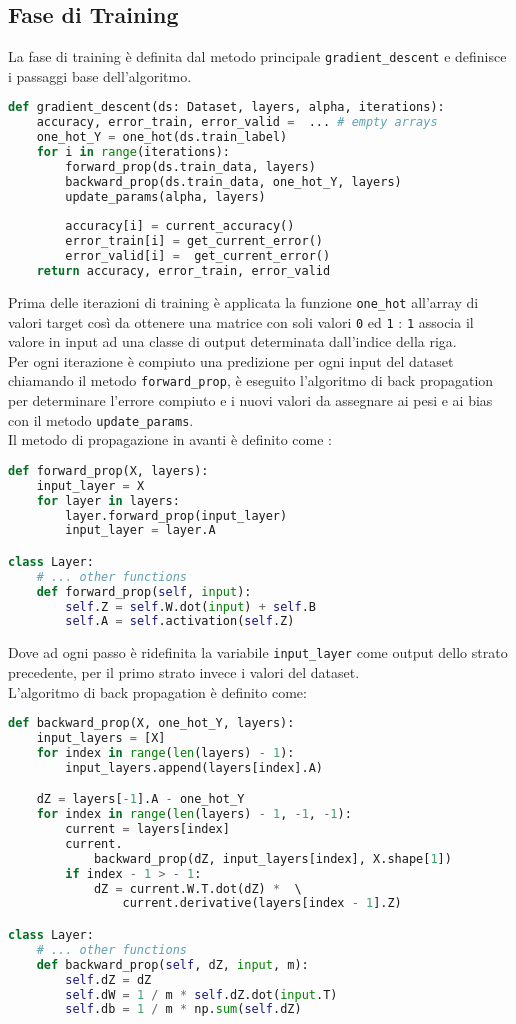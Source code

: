 \subsection{Fase di Training}
La fase di training è definita dal metodo principale \texttt{gradient\_descent} e definisce i passaggi base dell'algoritmo.
\begin{lstlisting}[language=Python]
def gradient_descent(ds: Dataset, layers, alpha, iterations):
    accuracy, error_train, error_valid =  ... # empty arrays
    one_hot_Y = one_hot(ds.train_label)
    for i in range(iterations):
        forward_prop(ds.train_data, layers)
        backward_prop(ds.train_data, one_hot_Y, layers)
        update_params(alpha, layers)
        
        accuracy[i] = current_accuracy()
        error_train[i] = get_current_error()
        error_valid[i] =  get_current_error()
    return accuracy, error_train, error_valid
\end{lstlisting}
Prima delle iterazioni di training è applicata la funzione \texttt{one\_hot} all'array di valori target così da ottenere una matrice con soli valori \texttt{0} ed \texttt{1} : \texttt{1} associa il valore in input ad una classe di output determinata dall'indice della riga. \\
Per ogni iterazione è compiuto una predizione per ogni input del dataset chiamando il metodo \texttt{forward\_prop}, è eseguito l'algoritmo di back propagation per determinare l'errore compiuto e i nuovi valori da assegnare ai pesi e ai bias con il metodo \texttt{update\_params}. \\
Il metodo di propagazione in avanti è definito come :
\begin{lstlisting}[language=Python]
def forward_prop(X, layers):
    input_layer = X
    for layer in layers:
        layer.forward_prop(input_layer)
        input_layer = layer.A

class Layer:
    # ... other functions
    def forward_prop(self, input):
        self.Z = self.W.dot(input) + self.B
        self.A = self.activation(self.Z)
\end{lstlisting}
Dove ad ogni passo è ridefinita la variabile \texttt{input\_layer} come output dello strato precedente, per il primo strato invece i valori del dataset. \\
L'algoritmo di back propagation è definito come:
\begin{lstlisting}[language=Python]
def backward_prop(X, one_hot_Y, layers):
    input_layers = [X]
    for index in range(len(layers) - 1):
        input_layers.append(layers[index].A)

    dZ = layers[-1].A - one_hot_Y
    for index in range(len(layers) - 1, -1, -1):
        current = layers[index]
        current.
            backward_prop(dZ, input_layers[index], X.shape[1])
        if index - 1 > - 1:
            dZ = current.W.T.dot(dZ) *  \ 
                current.derivative(layers[index - 1].Z)

class Layer:
    # ... other functions
    def backward_prop(self, dZ, input, m):
        self.dZ = dZ
        self.dW = 1 / m * self.dZ.dot(input.T)
        self.db = 1 / m * np.sum(self.dZ)
\end{lstlisting}
